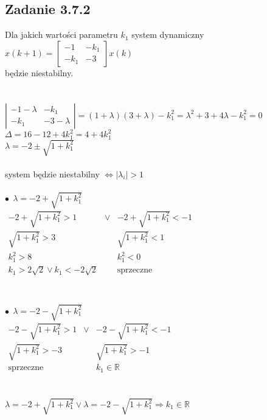 \pagebreak
\subsection*{Zadanie 3.7.2} {\color{darkgray}
	Dla jakich wartości parametru $k_1$ system dynamiczny\\
	$x(k+1)=\left[ \begin{array}{cc}    -1 &-k_1 \\ -k_1 &-3    \end{array}\right]x(k)$\\
	będzie niestabilny.\\
}\lineh
\\\\
$\left| \begin{array}{cc}    -1 -\lambda&-k_1 \\ -k_1 &-3-\lambda    \end{array}\right|=(1+\lambda)(3+\lambda)-k_1^2=\lambda^2+3+4\lambda-k_1^2=0$\\
$\Delta=16-12+4k_1^2=4+4k_1^2$\\
$\lambda=-2 \pm \sqrt{1+k_1^2}$\\
\\
system będzie niestabilny $\Leftrightarrow |\lambda_i|>1$\\
\\
$\bullet\ \ \lambda=-2 + \sqrt{1+k_1^2}$\\
$ \begin{array}{ccc}
-2 + \sqrt{1+k_1^2}>1                &\vee&    -2 + \sqrt{1+k_1^2}<-1  \\
\sqrt{1+k_1^2}>3                           & &         \sqrt{1+k_1^2}<1 \\
k_1^2>8                                           & &                  k_1^2<0\\
k_1>2\sqrt{2} \vee k_1<-2\sqrt{2} & &                     \text{sprzeczne}\\
\end{array} $\\
\\\\
$\bullet\ \ \lambda=-2 - \sqrt{1+k_1^2}$\\
$ \begin{array}{ccc}
-2 - \sqrt{1+k_1^2}>1                &\vee&    -2 - \sqrt{1+k_1^2}<-1  \\
\sqrt{1+k_1^2}>-3                           & &         \sqrt{1+k_1^2}>-1 \\
\text{sprzeczne}                                & &                  k_1 \in \mathbb{R}
\end{array} $\\
\\\\
$\lambda=-2 + \sqrt{1+k_1^2} \vee \lambda=-2 - \sqrt{1+k_1^2} \Rightarrow k_1 \in \mathbb{R}$

